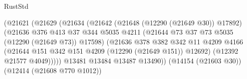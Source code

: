 \begin{lexlean}{RustStd}
\begin{coremodule}
{\begin{coremodule}
{{{{{{{{{{{{{{{{{{{{{{{{{{{{{{{{{{{{{{{{{{{{{{{{{{                                                (@21621
                                                  (@21629
                                                    (@21634
                                                      (@21642
                                                        (@21648 (@12290 (@21649 @30)) @17892)
                                                        (@21636
                                                          @376
                                                          @413
                                                          @37
                                                          @344
                                                          @5035
                                                          @4211
                                                          (@21644
                                                            @73
                                                            @37
                                                            @73
                                                            @5035
                                                            (@12290 (@21649 @73))
                                                            @17598)
                                                          (@21636
                                                            @378
                                                            @382
                                                            @342
                                                            @11
                                                            @4209
                                                            @4166
                                                            (@21644
                                                              @151
                                                              @342
                                                              @151
                                                              @4209
                                                              (@12290 (@21649 @151))
                                                              @12692)
                                                            (@12392 @21577 @4049)))))
                                                    @13481
                                                    @13484
                                                    @13487
                                                    @13490))
                                                (@14154 (@21603 @30))
                                                (@12414 (@21608 @770 @1012))
}}}}}}}}}}}}}}}}}}}}}}}}}}}}}}}}}}}}}}}}}}}}}}}}}}
\end{coremodule}}
\end{coremodule}
\end{lexlean}
